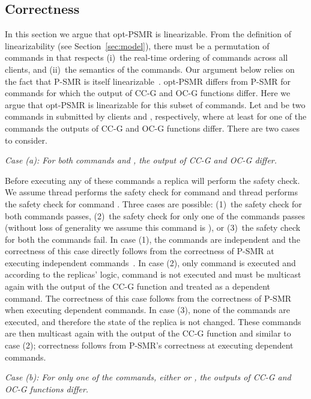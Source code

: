 \documentclass[conference]{IEEEtran}
\begin{document}
\subsection{Correctness}
\label{sec:correct}

In this section we argue that opt-PSMR is linearizable.
From the definition of linearizability (see Section~\ref{sec:model}), there must be a permutation  of commands in  that respects (i)~the real-time ordering of commands across all clients, and (ii)~the semantics of the commands. 
Our argument below relies on the fact that P-SMR is itself linearizable~\cite{p-smr}. 
opt-PSMR differs from P-SMR for commands for which the output of CC-G and OC-G functions differ.
Here we argue that opt-PSMR is linearizable for this subset of commands. 
Let  and  be two commands in  submitted by clients  and , respectively, where at least for one of the commands the outputs of CC-G and OC-G functions differ. There are two cases to consider. 

\noindent \emph{Case (a): For both commands  and , the output of CC-G and OC-G differ.} 



Before executing any of these commands a replica will perform the safety check. 
We assume thread  performs the safety check for command  and thread  performs the safety check for command . 
Three cases are possible: (1)~the safety check for both commands passes, (2)~the safety check for only one of the commands passes (without loss of generality we assume this command is ), or (3)~the safety check for both the commands fail. 
In case (1), the commands are independent and the correctness of this case directly follows from the correctness of P-SMR at executing independent commands~\cite{p-smr}. 
In case (2), only command  is executed and according to the replicas' logic, command  is not executed and must be multicast again with the output of the CC-G function and treated as a dependent command. 
The correctness of this case follows from the correctness of P-SMR when executing dependent commands. 
In case (3), none of the commands are executed, and therefore the state of the replica is not changed. 
These commands are then multicast again with the output of the CC-G function and similar to case (2); correctness follows from P-SMR's correctness at executing dependent commands. 



\noindent \emph{Case (b): For only one of the commands, either  or , the outputs of CC-G and OC-G functions differ.}
\end{document}
